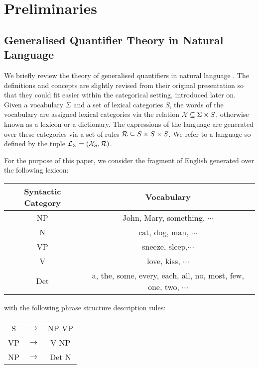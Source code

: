 
\section{Preliminaries}
\label{prelim}

\subsection{Generalised Quantifier Theory in Natural Language}
\label{GenQuant}

We briefly review the theory of generalised quantifiers in natural language \cite{BarwiseCooper81}.   The definitions and concepts are slightly revised from their original presentation so that they could fit easier  within the categorical setting, introduced later on. 
Given  a vocabulary $\Sigma$ and a set of lexical categories $S$, the words of the vocabulary are assigned lexical categories via the relation ${\cal X} \subseteq \Sigma \times S$, otherwise known as a lexicon or a dictionary.  The expressions of the language are generated over these categories via a  set of  rules ${\cal R} \subseteq S \times S \times S$.  We refer to a language so defined  by the tuple ${\cal L}_{\Sigma} = ({\cal X}_S, {\cal R})$. 


For the purpose of this paper, we consider the fragment of English generated over the following lexicon:

\begin{center}
\begin{tabular}{c|c}
Syntactic Category & Vocabulary\\
\hline
NP &  John, Mary, something, $\cdots$\\
N&   cat, dog, man, $\cdots$\\
VP &  sneeze, sleep,$\cdots$\\
V &   love, kiss, $\cdots$\\
Det &  a, the, some, every, each, all, no, most, few, one, two, $\cdots$ 
\end{tabular}
\end{center}

\noindent
with the   following phrase structure description rules:

\begin{center}
\begin{tabular}{ccc}
S & $\to$ & NP VP \\
VP & $\to$ & V NP \\
NP &$\to$ & Det N \\
\end{tabular}
\end{center}


